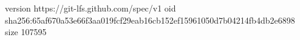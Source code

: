 version https://git-lfs.github.com/spec/v1
oid sha256:65af670a53e66f3aa019fcf29eab16cb152ef15961050d7b04214fb4db2e6898
size 107595
